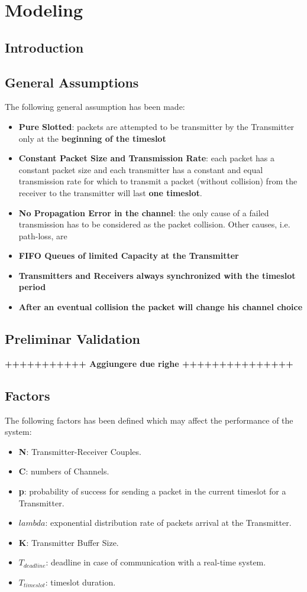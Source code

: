 \section{Modeling}
\subsection{Introduction}

\subsection{General Assumptions}
The following general assumption has been made:
\begin{itemize}
	\item \textbf{Pure Slotted}: packets are attempted to be transmitter by the Transmitter only at the \textbf{beginning of the timeslot}
	\item \textbf{Constant Packet Size and Transmission Rate}: each packet has a constant packet size and each transmitter has a constant and equal transmission rate for which to transmit a packet (without collision) from the receiver to the transmitter will last \textbf{one timeslot}.
	\item \textbf{No Propagation Error in the channel}: the only cause of a failed transmission has to be considered as the packet collision. Other causes, i.e. path-loss, are 
	\item \textbf{FIFO Queues of limited Capacity at the Transmitter} 
	\item \textbf{Transmitters and Receivers always synchronized with the timeslot period}
	\item \textbf{After an eventual collision the packet will change his channel choice}
\end{itemize}

\subsection{Preliminar Validation}
\textbf{+++++++++++ Aggiungere due righe +++++++++++++++}
\subsection{Factors}
The following factors has been defined which may affect the performance of the system:
\begin{itemize}
	\item \textbf{N}: Transmitter-Receiver Couples.
	\item \textbf{C}: numbers of Channels.
	\item \textbf{p}: probability of success for sending a packet in the current timeslot for a Transmitter.
	\item \textbf{$lambda$}: exponential distribution rate of packets arrival at the Transmitter.
	\item \textbf{K}: Transmitter Buffer Size.
	\item $T_{deadline}$: deadline in case of communication with a real-time system.
	\item $T_{timeslot}$: timeslot duration. 
\end{itemize}